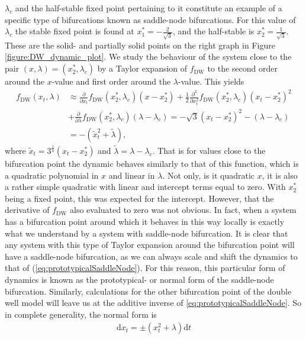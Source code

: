 $\lambda_c$ and the half-stable fixed point pertaining to it constitute an example of a specific type of bifurcations known as saddle-node bifurcations. For this value of $\lambda_c$ the stable fixed point is found at $x_1^* = -\frac{2}{\sqrt{3}}$, and the half-stable is $x_2^* = \frac{1}{\sqrt{3}}$. These are the solid- and partially solid points on the right graph in Figure \ref{figure:DW_dynamic_plot}. We study the behaviour of the system close to the pair $(x, \lambda) = (x_2^*, \lambda_c)$ by a Taylor expansion of $f_{\mathrm{DW}}$ to the second order around the $x$-value and first order around the $\lambda$-value. This yields
\begin{align}
    f_{\mathrm{DW}}(x_t,\lambda)&\approx \frac{\partial}{\partial x_t}f_{\mathrm{DW}}(x_2^*,\lambda_c)(x-x_2^*) + \frac{1}{2}\frac{\partial^2}{\partial x_t^2}f_{\mathrm{DW}}(x_2^*,\lambda_c)(x_t-x_2^*)^2 \nonumber \\
     &+ \frac{\partial}{\partial \lambda}f_{\mathrm{DW}}(x_2^*,\lambda_c)(\lambda - \lambda_c) = -\sqrt{3}\left(x_t-x_2^*\right)^2 - \left(\lambda - \lambda_c\right) \nonumber \\&= -\left(\tilde{x}_t^2 + \tilde{\lambda}\right), \label{eq:prototypicalSaddleNode}
\end{align}
where $\tilde{x}_t = 3^{\frac{1}{4}}\left(x_t-x_2^*\right)$ and  $\tilde{\lambda} = \lambda - \lambda_c$. That is for values close to the bifurcation point the dynamic behaves similarly to that of this function, which is a quadratic polynomial in $x$ and linear in $\lambda$. Not only, is it quadratic $x$, it is also a rather simple quadratic with linear and intercept terms equal to zero. With $x_2^*$ being a fixed point, this was expected for the intercept. However, that the derivative of $f_{\mathrm{DW}}$ also evaluated to zero was not obvious. In fact, when a system has a bifurcation point around which it behaves in this way locally is exactly what we understand by a system with saddle-node bifurcation. It is clear that any system with this type of Taylor expansion around the bifurcation point will have a saddle-node bifurcation, as we can always scale and shift the dynamics to that of (\ref{eq:prototypicalSaddleNode}). For this reason, this particular form of dynamics is known as the prototypical- or normal form of the saddle-node bifurcation. Similarly, calculations for the other bifurcation point of the double well model will leave us at the additive inverse of \ref{eq:prototypicalSaddleNode}. So in complete generality, the normal form is
\begin{align}
    \mathrm{d}x_t = \pm\left(x_t^2 + \lambda\right)\mathrm{d}t
\end{align} 
